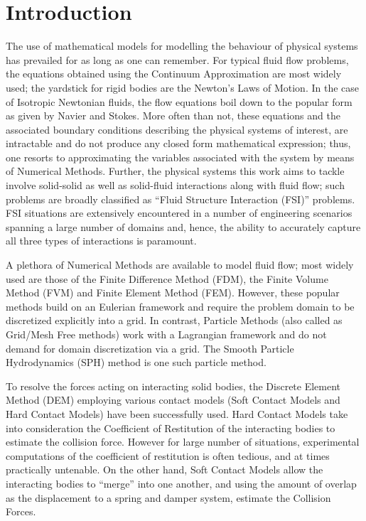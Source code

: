 \chapter{Introduction}

The use of mathematical models for modelling the behaviour of physical systems has prevailed for as long as one can remember. For typical fluid flow problems, the equations obtained using the Continuum Approximation are most widely used; the yardstick for rigid bodies are the Newton's Laws of Motion. In the case of Isotropic Newtonian fluids, the flow equations boil down to the popular form as given by Navier and Stokes. More often than not, these equations and the associated boundary conditions describing the physical systems of interest, are intractable and do not produce any closed form mathematical expression; thus, one resorts to approximating the variables associated with the system by means of Numerical Methods. Further, the physical systems this work aims to tackle involve solid-solid as well as solid-fluid interactions along with fluid flow; such problems are broadly classified as ``Fluid Structure Interaction (FSI)'' problems. FSI situations are extensively encountered in a number of engineering scenarios spanning a large number of domains and, hence, the ability to accurately capture all three types of interactions is paramount.

A plethora of Numerical Methods are available to model fluid flow; most widely used are those of the Finite Difference Method (FDM), the Finite Volume Method (FVM) and Finite Element Method (FEM). However, these popular methods build on an Eulerian framework and require the problem domain to be discretized explicitly into a grid. In contrast, Particle Methods (also called as Grid/Mesh Free methods) work with a Lagrangian framework and do not demand for domain discretization via a grid. The Smooth Particle Hydrodynamics (SPH) method is one such particle method.

To resolve the forces acting on interacting solid bodies, the Discrete Element Method (DEM) employing various contact models (Soft Contact Models and Hard Contact Models) have been successfully used. Hard Contact Models take into consideration the Coefficient of Restitution of the interacting bodies to estimate the collision force. However for large number of situations, experimental computations of the coefficient of restitution is often tedious, and at times practically untenable. On the other hand, Soft Contact Models allow the interacting bodies to ``merge'' into one another, and using the amount of overlap as the displacement to a spring and damper system, estimate the Collision Forces.

